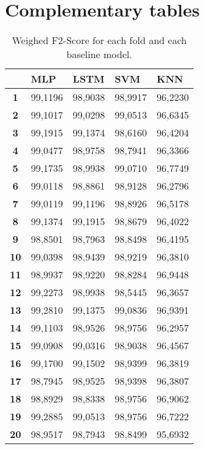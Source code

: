 \newpage

\chapter{Complementary tables}\label{chap:appendix}

\begin{table}[]
\centering
\caption{Weighed F2-Score for each fold and each baseline model.}
\begin{tabular}{c|l|l|l|l}
\multicolumn{1}{l|}{} & MLP     & LSTM    & SVM     & KNN     \\ \hline
\textbf{1}            & 99,1196 & 98,9038 & 98,9917 & 96,2230 \\ \hline
\textbf{2}            & 99,1017 & 99,0298 & 99,0513 & 96,6345 \\ \hline
\textbf{3}            & 99,1915 & 99,1374 & 98,6160 & 96,4204 \\ \hline
\textbf{4}            & 99,0477 & 98,9758 & 98,7941 & 96,3366 \\ \hline
\textbf{5}            & 99,1735 & 98,9938 & 99,0710 & 96,7749 \\ \hline
\textbf{6}            & 99,0118 & 98,8861 & 98,9128 & 96,2796 \\ \hline
\textbf{7}            & 99,0119 & 99,1196 & 98,8926 & 96,5178 \\ \hline
\textbf{8}            & 99,1374 & 99,1915 & 98,8679 & 96,4022 \\ \hline
\textbf{9}            & 98,8501 & 98,7963 & 98,8498 & 96,4195 \\ \hline
\textbf{10}           & 99,0398 & 98,9439 & 98,9219 & 96,3810 \\ \hline
\textbf{11}           & 98,9937 & 98,9220 & 98,8284 & 96,9448 \\ \hline
\textbf{12}           & 99,2273 & 98,9938 & 98,5445 & 96,3657 \\ \hline
\textbf{13}           & 99,2810 & 99,1375 & 99,0836 & 96,9391 \\ \hline
\textbf{14}           & 99,1103 & 98,9526 & 98,9756 & 96,2957 \\ \hline
\textbf{15}           & 99,0908 & 99,0316 & 98,9038 & 96,4567 \\ \hline
\textbf{16}           & 99,1700 & 99,1502 & 98,9399 & 96,3819 \\ \hline
\textbf{17}           & 98,7945 & 98,9525 & 98,9398 & 96,3807 \\ \hline
\textbf{18}           & 98,8929 & 98,8338 & 98,9756 & 96,9062 \\ \hline
\textbf{19}           & 99,2885 & 99,0513 & 98,9756 & 96,7222 \\ \hline
\textbf{20}           & 98,9517 & 98,7943 & 98,8499 & 95,6932
\end{tabular}
\label{tab:full-folds}
\end{table}

